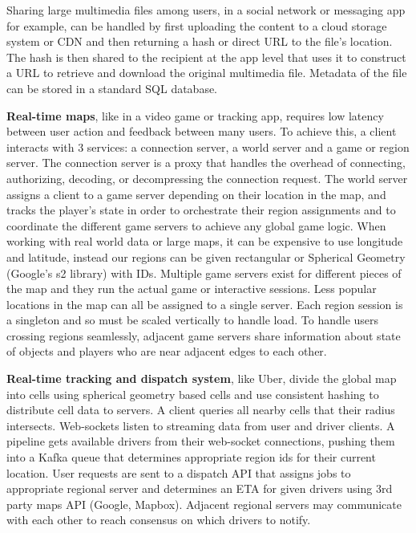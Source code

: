 \documentclass{article}
\begin{document}
    Sharing large multimedia files among users, in a social network or messaging app for example, can be handled by first uploading the content to a cloud storage system or CDN and then returning a hash or direct URL to the file's location. The hash is then shared to the recipient at the app level that uses it to construct a URL to retrieve and download the original multimedia file. Metadata of the file can be stored in a standard SQL database.
    
    \textbf{Real-time maps}, like in a video game or tracking app, requires low latency between user action and feedback between many users. To achieve this, a client interacts with 3 services: a connection server, a world server and a game or region server. The connection server is a proxy that handles the overhead of connecting,   authorizing, decoding, or decompressing the connection request. The world server assigns a client to a game server depending on their location in the map, and tracks the player's state in order to orchestrate their region assignments and to coordinate the different game servers to achieve any global game logic. When working with real world data or large maps, it can be expensive to use longitude and latitude, instead our regions can be given rectangular or Spherical Geometry (Google's s2 library) with IDs. Multiple game servers exist for different pieces of the map and they run the actual game or interactive sessions. Less popular locations in the map can all be assigned to a single server. Each region session is a singleton and so must be scaled vertically to handle load. To handle users crossing regions seamlessly, adjacent game servers share information about state of objects and players who are near adjacent edges to each other. 
    
    \textbf{Real-time tracking and dispatch system}, like Uber, divide the global map into cells using spherical geometry based cells and use consistent hashing to distribute cell data to servers. A client queries all nearby cells that their radius intersects. Web-sockets listen to streaming data from user and driver clients. A pipeline gets available drivers from their web-socket connections, pushing them into a Kafka queue that determines appropriate region ids for their current location. User requests are sent to a dispatch API that assigns jobs to appropriate regional server and determines an ETA for given drivers using 3rd party maps API (Google, Mapbox). Adjacent regional servers may communicate with each other to reach consensus on which drivers to notify.
    
\end{document}
